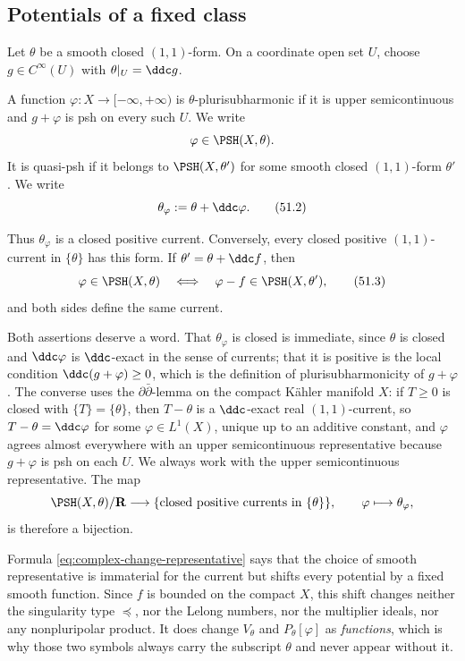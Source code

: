 \subsection{Potentials of a fixed class}
\label{sec:ch51-potentials}

Let \(\theta\) be a smooth closed \((1,1)\)-form.  On a coordinate open
set \(U\), choose \(g\in C^\infty(U)\) with \(\theta|_U=\ddc g\).

\begin{definition}[Potentials]
\label{def:complex-theta-psh}
A function \(\varphi:X\to[-\infty,+\infty)\) is
\(\theta\)-plurisubharmonic if it is upper semicontinuous and
\(g+\varphi\) is psh on every such \(U\).  We write
\[
                   \varphi\in\PSH(X,\theta).
\]
It is quasi-psh if it belongs to \(\PSH(X,\theta')\) for some smooth
closed \((1,1)\)-form \(\theta'\).  We write
\[
       \theta_\varphi:=\theta+\ddc\varphi .
\tag{51.2}\label{eq:complex-current-potential}
\]
\end{definition}

Thus \(\theta_\varphi\) is a closed positive current.  Conversely, every
closed positive \((1,1)\)-current in \(\{\theta\}\) has this form.
If \(\theta'=\theta+\ddc f\), then
\[
 \varphi\in\PSH(X,\theta)
 \quad\Longleftrightarrow\quad
 \varphi-f\in\PSH(X,\theta'),
\tag{51.3}\label{eq:complex-change-representative}
\]
and both sides define the same current.

Both assertions deserve a word.  That \(\theta_\varphi\) is closed is
immediate, since \(\theta\) is closed and \(\ddc\varphi\) is
\(\ddc\)-exact in the sense of currents; that it is positive is the local
condition \(\ddc(g+\varphi)\geq0\), which is the definition of
plurisubharmonicity of \(g+\varphi\).  The converse uses the
\(\partial\bar\partial\)-lemma on the compact K\"ahler manifold \(X\): if
\(T\geq0\) is closed with \(\{T\}=\{\theta\}\), then \(T-\theta\) is a
\(\ddc\)-exact real \((1,1)\)-current, so \(T-\theta=\ddc\varphi\) for some
\(\varphi\in L^1(X)\), unique up to an additive constant, and
\(\varphi\) agrees almost everywhere with an upper semicontinuous
representative because \(g+\varphi\) is psh on each \(U\).  We always work
with the upper semicontinuous representative.  The map
\[
 \PSH(X,\theta)/\mathbf R
 \longrightarrow
 \{\text{closed positive currents in }\{\theta\}\},
 \qquad
 \varphi\longmapsto\theta_\varphi ,
\]
is therefore a bijection.

Formula \eqref{eq:complex-change-representative} says that the choice of
smooth representative is immaterial for the current but shifts every
potential by a fixed smooth function.  Since \(f\) is bounded on the
compact \(X\), this shift changes neither the singularity type
\(\preceq\), nor the Lelong numbers, nor the multiplier ideals, nor any
nonpluripolar product.  It does change \(V_\theta\) and
\(P_\theta[\varphi]\) as \emph{functions}, which is why those two symbols
always carry the subscript \(\theta\) and never appear without it.

